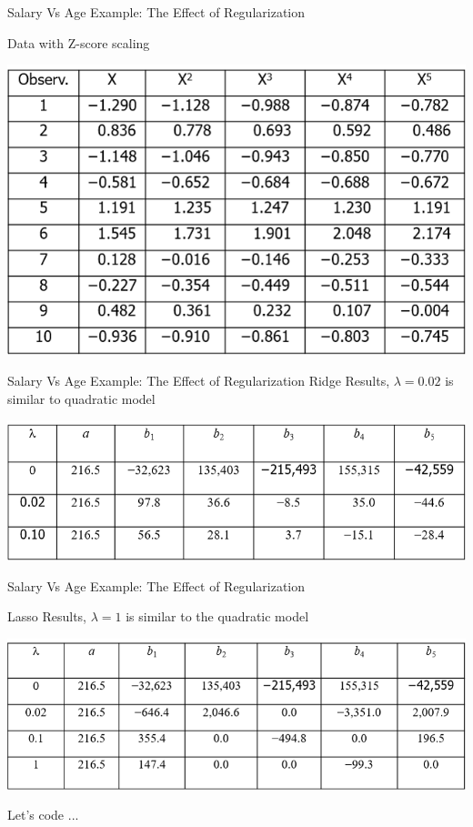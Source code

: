 \documentclass[11pt]{beamer}
\begin{document}
\begin{frame}{Salary Vs Age Example: The Effect of Regularization}

Data with Z-score scaling
	\begin{center}
	\includegraphics[scale=.6]{../05-pictures/lesson-2-2_pic_18.png}
	\end{center}
\end{frame}
\begin{frame}{Salary Vs Age Example: The Effect of Regularization}
Ridge Results, $\lambda=0.02$ is similar to quadratic model
	\begin{center}
	\includegraphics[scale=.55]{../05-pictures/lesson-2-2_pic_19.png}
	\end{center}
\end{frame}
\begin{frame}{Salary Vs Age Example: The Effect of Regularization}

Lasso Results, $\lambda=1$ is similar to the quadratic model

	\begin{center}
	\includegraphics[scale=.5]{../05-pictures/lesson-2-2_pic_20.png}
	\end{center}
\end{frame}
\begin{frame}{Let's code ...}
\end{frame}
\end{document}
